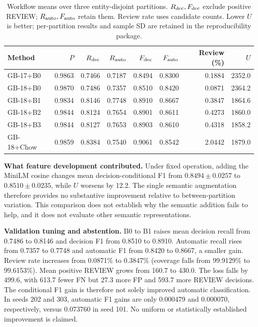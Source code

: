\documentclass[conference]{IEEEtran}
\begin{document}
\begin{table}[t]
\caption{Workflow means over three entity-disjoint partitions. $R_{\rm dec},F_{\rm dec}$ exclude positive REVIEW; $R_{\rm auto},F_{\rm auto}$ retain them. Review rate uses candidate counts. Lower $U$ is better; per-partition results and sample SD are retained in the reproducibility package.}
\label{tab:results}
\centering
\begin{tabular}{lrrrrrrr}
\toprule
Method & $P$ & $R_{\rm dec}$ & $R_{\rm auto}$ & $F_{\rm dec}$ & $F_{\rm auto}$ & Review (\%) & $U$\\
\midrule
GB-17+B0 & 0.9863 & 0.7466 & 0.7187 & 0.8494 & 0.8300 & 0.1884 & 2352.0\\
GB-18+B0 & 0.9870 & 0.7486 & 0.7357 & 0.8510 & 0.8420 & 0.0871 & 2364.2\\
GB-18+B1 & 0.9834 & 0.8146 & 0.7748 & 0.8910 & 0.8667 & 0.3847 & 1864.6\\
GB-18+B2 & 0.9844 & 0.8124 & 0.7654 & 0.8901 & 0.8611 & 0.4273 & 1860.0\\
GB-18+B3 & 0.9844 & 0.8127 & 0.7653 & 0.8903 & 0.8610 & 0.4318 & 1858.2\\
GB-18+Chow & 0.9859 & 0.8384 & 0.7540 & 0.9061 & 0.8542 & 2.0442 & 1879.0\\
\bottomrule
\end{tabular}
\end{table}

\textbf{What feature development contributed.} Under fixed operation, adding the MiniLM cosine changes mean decision-conditional F1 from $0.8494\pm0.0257$ to $0.8510\pm0.0235$, while $U$ worsens by 12.2. The single semantic augmentation therefore provides no substantive improvement relative to between-partition variation. This comparison does not establish why the semantic addition fails to help, and it does not evaluate other semantic representations.

\textbf{Validation tuning and abstention.} B0 to B1 raises mean decision recall from 0.7486 to 0.8146 and decision F1 from 0.8510 to 0.8910. Automatic recall rises from 0.7357 to 0.7748 and automatic F1 from 0.8420 to 0.8667, a smaller gain. Review rate increases from 0.0871\% to 0.3847\% (coverage falls from 99.9129\% to 99.6153\%). Mean positive REVIEW grows from 160.7 to 430.0. The loss falls by 499.6, with 613.7 fewer FN but 27.3 more FP and 593.7 more REVIEW decisions. The conditional F1 gain is therefore not solely improved automatic classification. In seeds 202 and 303, automatic F1 gains are only 0.000479 and 0.000070, respectively, versus 0.073760 in seed 101. No uniform or statistically established improvement is claimed.
\end{document}
